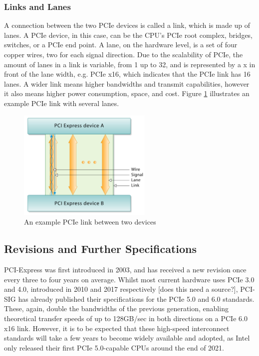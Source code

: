 \subsubsection{Links and Lanes}
A connection between the two PCIe devices is called a link, which is made up of lanes. \cite{jackson_pci_2012} A PCIe device, in this case, can be the CPU's PCIe root complex, bridges, switches, or a PCIe end point. A lane, on the hardware level, is a set of four copper wires, two for each signal direction.\cite{jackson_pci_2012} Due to the scalability of PCIe, the amount of lanes in a link is variable, from 1 up to 32, and is represented by a x in front of the lane width, e.g. PCIe x16, which indicates that the PCIe link has 16 lanes. A wider link means higher bandwidths and transmit capabilities, however it also means higher power consumption, space, and cost. \cite{jackson_pci_2012} Figure \ref{fig:link} illustrates an example PCIe link with several lanes.


\begin{figure}
\begin{center}
\includegraphics[height = 200px]{figures/PCIE-link}
\caption{An example PCIe link between two devices \cite{budruk_pci_2014}}
\label{fig:link}
\end{center}
\end{figure}

\subsection{Revisions and Further Specifications}

PCI-Express was first introduced in 2003, and has received a new revision once every three to four years on average. Whilst most current hardware uses PCIe 3.0 and 4.0, introduced in 2010 and 2017 respectively [does this need a source?], PCI-SIG has already published their specifications for the PCIe 5.0 and 6.0 standards. These, again, double the bandwidths of the previous generation, enabling theoretical transfer speeds of up to 128GB/sec in both directions on a PCIe 6.0 x16 link.\cite{sharma_pci_2020} However, it is to be expected that these high-speed interconnect standards will take a few years to become widely available and adopted, as Intel only released their first PCIe 5.0-capable CPUs around the end of 2021. \cite{intel_product_nodate} 

